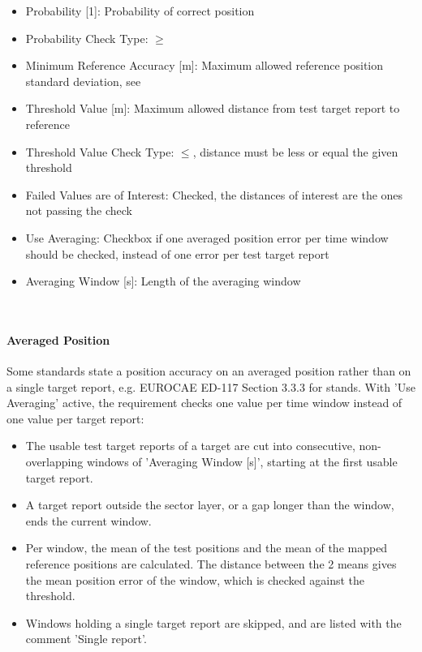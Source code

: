 \begin{itemize}  
\item Probability [1]: Probability of correct position
\item Probability Check Type: $\geq$
\item Minimum Reference Accuracy [m]: Maximum allowed reference position standard deviation, see 
\item Threshold Value [m]: Maximum allowed distance from test target report to reference
\item Threshold Value Check Type: $\leq$, distance must be less or equal the given threshold
\item Failed Values are of Interest: Checked, the distances of interest are the ones not passing the check
\item Use Averaging: Checkbox if one averaged position error per time window should be checked, instead of one error per test target report
\item Averaging Window [s]: Length of the averaging window
\end{itemize}
\ \\

\paragraph{Averaged Position}

Some standards state a position accuracy on an averaged position rather than on a single target report, e.g. EUROCAE ED-117 Section 3.3.3 for stands. With 'Use Averaging' active, the requirement checks one value per time window instead of one value per target report:

\begin{itemize}
\item The usable test target reports of a target are cut into consecutive, non-overlapping windows of 'Averaging Window [s]', starting at the first usable target report.
\item A target report outside the sector layer, or a gap longer than the window, ends the current window.
\item Per window, the mean of the test positions and the mean of the mapped reference positions are calculated. The distance between the 2 means gives the mean position error of the window, which is checked against the threshold.
\item Windows holding a single target report are skipped, and are listed with the comment 'Single report'.
\end{itemize}
\ \\

